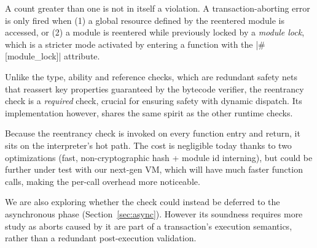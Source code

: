 A count greater than one is not in itself a violation. A transaction-aborting error is only fired when 
(1) a global resource defined by the reentered module is accessed, or 
(2) a module is reentered while previously locked by a \emph{module lock}, which is a stricter mode activated by entering a function with the |#[module_lock]| attribute.

Unlike the type, ability and reference checks, which are redundant safety nets that reassert key properties guaranteed by the bytecode verifier, the reentrancy check is a \emph{required} check,
crucial for ensuring safety with dynamic dispatch. Its implementation however, shares the same spirit as the other runtime checks.

Because the reentrancy check is invoked on every function entry and return, it sits on the interpreter's hot path.
The cost is negligible today thanks to two optimizations (fast, non-cryptographic hash + module id interning), but could be further under test with our next-gen VM, 
which will have much faster function calls, making the per-call overhead more noticeable.

We are also exploring whether the check could instead be deferred to the asynchronous phase (Section~\ref{sec:async}). However its soundness requires more study
as aborts caused by it are part of a transaction's execution semantics, rather than a redundant post-execution validation.

